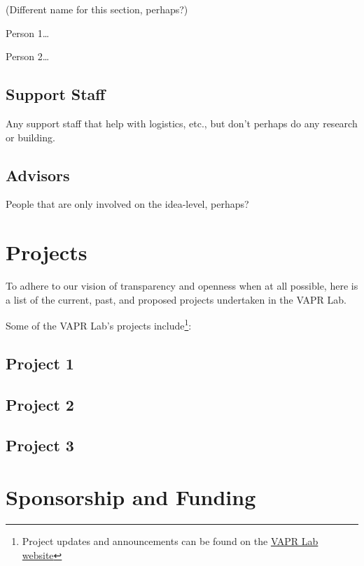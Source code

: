 \documentclass[12pt,]{memoir}
\let\rmarkdownfootnote\footnote%
\def\footnote{\protect\rmarkdownfootnote}
\begin{document}
(Different name for this section, perhaps?)

Person 1\ldots{}

Person 2\ldots{}

\hypertarget{support-staff}{%
\section{Support Staff}\label{support-staff}}

Any support staff that help with logistics, etc., but don't perhaps do any research or building.

\hypertarget{advisors}{%
\section{Advisors}\label{advisors}}

People that are only involved on the idea-level, perhaps?

\hypertarget{projects}{%
\chapter{Projects}\label{projects}}

To adhere to our vision of transparency and openness when at all possible, here is a list of the current, past, and proposed projects undertaken in the VAPR Lab.

Some of the VAPR Lab's projects include\footnote{Project updates and announcements can be found on the \href{https://VAPR-Lab.github.io/website/}{VAPR Lab website}}:

\hypertarget{project-1}{%
\section{Project 1}\label{project-1}}

\hypertarget{project-2}{%
\section{Project 2}\label{project-2}}

\hypertarget{project-3}{%
\section{Project 3}\label{project-3}}

\hypertarget{funding}{%
\chapter{Sponsorship and Funding}\label{funding}}
\end{document}
